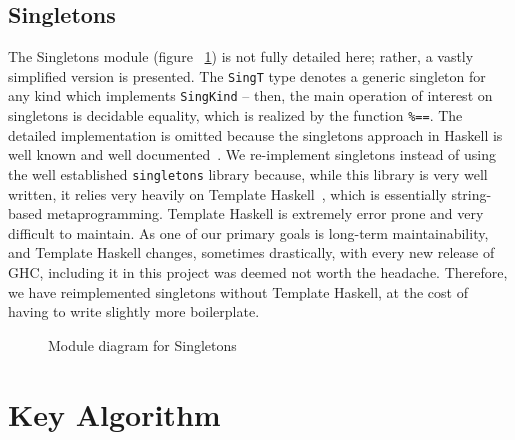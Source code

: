     
\subsection{Singletons}\label{subsec:Singletons}

The Singletons module (figure ~\ref{fig:singletons}) is 
not fully detailed here; rather, a vastly simplified version is presented. The
\lstinline{SingT} type denotes a generic singleton for 
any kind which implements
\lstinline{SingKind} -- then, the main operation of 
interest on singletons is
decidable equality, which is realized by the function 
\lstinline{%==}. The
    detailed implementation is omitted because the 
    singletons approach in Haskell
    is well known and well 
    documented~\cite{singletons}. We re-implement
    singletons instead of using the well established 
    \texttt{singletons} library
    because, while this library is very well written, 
    it relies very heavily on
    Template Haskell~\cite{th}, which is essentially 
    string-based
    metaprogramming. Template Haskell is extremely 
    error prone and very difficult
    to maintain. As one of our primary goals is 
    long-term maintainability, and
    Template Haskell changes, sometimes drastically, 
    with every new release of
    GHC, including it in this project was deemed not 
    worth the
    headache. Therefore, we have reimplemented 
    singletons without Template
    Haskell, at the cost of having to write slightly 
    more boilerplate.


\begin{figure}[!ht]
    \caption{Module diagram for Singletons} \label{fig:singletons}
\end{figure}

\section{Key Algorithm}

